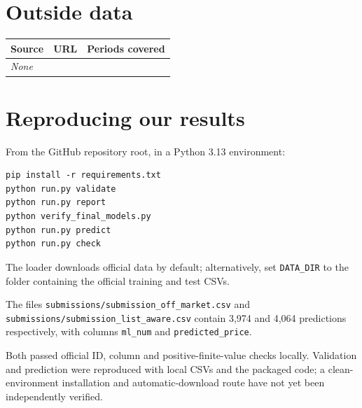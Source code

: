 \documentclass[11pt]{article}
\begin{document}
\section*{Outside data}
\begin{tabular}{lll}
\toprule
Source & URL & Periods covered \\
\midrule
\textit{None} & & \\
\bottomrule
\end{tabular}

\section*{Reproducing our results}
From the GitHub repository root, in a Python 3.13 environment:
\begin{verbatim}
pip install -r requirements.txt
python run.py validate
python run.py report
python verify_final_models.py
python run.py predict
python run.py check
\end{verbatim}
The loader downloads official data by default; alternatively, set \texttt{DATA\_DIR} to the folder containing the official training and test CSVs. 

The files \texttt{submissions/submission\_off\_market.csv} and \texttt{submissions/submission\_list\_aware.csv} contain 3,974 and 4,064 predictions respectively, with columns \texttt{ml\_num} and \texttt{predicted\_price}. 

Both passed official ID, column and positive-finite-value checks locally. Validation and prediction were reproduced with local CSVs and the packaged code; a clean-environment installation and automatic-download route have not yet been independently verified.
\end{document}
